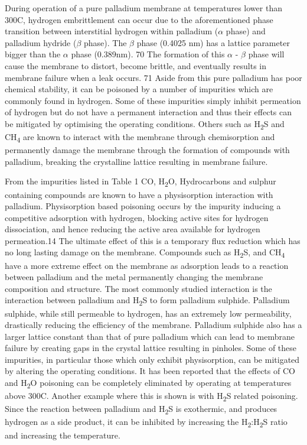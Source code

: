 During operation of a pure palladium membrane at temperatures lower than 300\textdegree C, 
hydrogen embrittlement can occur due to the aforementioned phase transition between 
interstitial hydrogen within palladium ($\alpha$ phase) and palladium hydride ($\beta$ phase). 
The $\beta$ phase (0.4025 nm) has a lattice parameter bigger than the $\alpha$ phase 
(0.389nm). 70  The formation of this $\alpha$ - $\beta$ phase will cause the membrane to distort, 
become brittle, and eventually results in membrane failure when a leak occurs. 71 
Aside from this pure palladium has poor chemical stability, it can be poisoned by a 
number of impurities which are commonly found in hydrogen. Some of these impurities 
simply inhibit permeation of hydrogen but do not have a permanent interaction and thus 
their effects can be mitigated by optimising the operating conditions. Others such as 
H\textsubscript{2}S and CH\textsubscript{4} are known to interact with the membrane through chemisorption and permanently 
damage the membrane through the formation of compounds with palladium, breaking the 
crystalline lattice resulting in membrane failure.  

From the impurities listed in Table 1 CO, H\textsubscript{2}O, Hydrocarbons and sulphur 
containing compounds are known to have a physisorption interaction with palladium. 
Physisorption based poisoning occurs by the impurity inducing a competitive adsorption 
with hydrogen, blocking active sites for hydrogen dissociation, and hence reducing the 
active area available for hydrogen permeation.14 The ultimate effect of this is a temporary 
flux reduction which has no long lasting damage on the membrane. Compounds such as 
H\textsubscript{2}S, and CH\textsubscript{4} have a more extreme effect on the membrane as 
adsorption leads to a reaction between palladium and the metal permanently changing the 
membrane composition and structure. The most commonly studied interaction is the interaction 
between palladium and H\textsubscript{2}S to form palladium sulphide. Palladium sulphide, while still
permeable to hydrogen, has an extremely low permeability, drastically reducing the efficiency 
of the membrane. Palladium sulphide also has a larger lattice constant than that of pure 
palladium which can lead to membrane failure by creating gaps in the crystal lattice 
resulting in pinholes. Some of these impurities, in particular those which only exhibit 
physisorption, can be mitigated by altering the operating conditions. It has been reported 
that the effects of CO and H\textsubscript{2}O poisoning can be completely eliminated by operating at 
temperatures above 300\textdegree C. Another example where this is shown is with H\textsubscript{2}S related poisoning. 
Since the reaction between palladium and H\textsubscript{2}S is exothermic, and produces hydrogen as a side 
product, it can be inhibited by increasing the H\textsubscript{2}:H\textsubscript{2}S ratio and increasing the temperature.  

